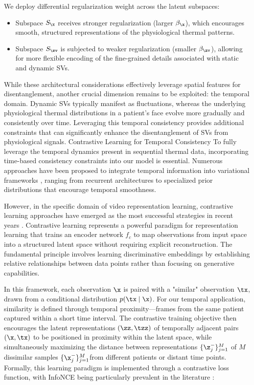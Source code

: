 We deploy differential regularization weight across the latent subspaces:
\begin{itemize}
  \item Subspace $S_\x$ receives stronger regularization (larger $\beta_{\x}$), which encourages smooth, structured representations of the physiological thermal patterns.
  \item Subspace $S_\zv$ is subjected to weaker regularization (smaller $\beta_\zv$), allowing for more flexible encoding of the fine-grained details associated with static and dynamic SVs.
\end{itemize}

While these architectural considerations effectively leverage spatial features for disentanglement, another crucial dimension remains to be exploited: the temporal domain. Dynamic SVs typically manifest as fluctuations, whereas the underlying physiological thermal distributions in a patient's face evolve more gradually and consistently over time. Leveraging this temporal consistency provides additional constraints that can significantly enhance the disentanglement of SVs from physiological signals.
Contrastive Learning for Temporal Consistency
To fully leverage the temporal dynamics present in sequential thermal data, incorporating time-based consistency constraints into our model is essential. Numerous approaches have been proposed to integrate temporal information into variational frameworks \citep{bowman2015generating, li2018disentangled, zhu2020s3vae, NEURIPS2023_19a567ab, sachdeva2019sequential, fortuin2020gp}, ranging from recurrent architectures to specialized prior distributions that encourage temporal smoothness.

However, in the specific domain of video representation learning, contrastive learning approaches have emerged as the most successful strategies in recent years \cite{hu2024comprehensive, qian2021spatiotemporal}.
Contrastive learning represents a powerful paradigm for representation learning that trains an encoder network $f_{c}$ to map observations from input space into a structured latent space without requiring explicit reconstruction. The fundamental principle involves learning discriminative embeddings by establishing relative relationships between data points rather than focusing on generative capabilities.

In this framework, each observation $\x$ is paired with a "similar" observation $\tx$, drawn from a conditional distribution $p(\tx \mid \x)$. For our temporal application, similarity is defined through temporal proximity—frames from the same patient captured within a short time interval. The contrastive training objective then encourages the latent representations $(\zz, \tzz)$ of temporally adjacent pairs $(\x, \tx)$ to be positioned in proximity within the latent space, while simultaneously maximizing the distance between representations $\{\z_j^-\}_{j=1}^M$ of $M$ dissimilar samples $\{\x_j^-\}_{j=1}^M$from different patients or distant time points.
Formally, this learning paradigm is implemented through a contrastive loss function, with InfoNCE being particularly prevalent in the literature \citep{wu2018unsupervised, he2020momentum, tian2020contrastive, bachman2019learning, chen2020simple}:

